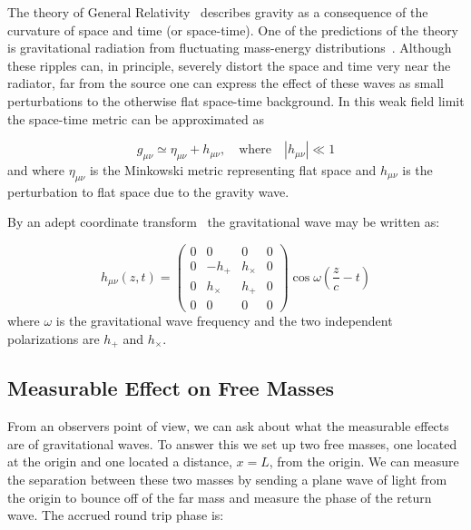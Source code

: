 

The theory of General Relativity~\cite{Einstein:Book} describes gravity as a 
consequence of the curvature of space and time (or space-time). One of the
predictions of the theory is gravitational radiation from fluctuating
mass-energy distributions~\cite{MTW}. Although these ripples can, 
in principle, severely distort the space and time very near the radiator,
far from the source one can express the effect of these waves as small
perturbations to the otherwise flat space-time background. In this weak field limit
the space-time metric can be approximated as

\begin{equation}
g_{\mu \nu} \simeq \eta_{\mu \nu} + h_{\mu \nu}, 
                  \quad \mbox{where} \quad   |h_{\mu \nu}| \ll 1
\label{eq:gmunu}
\end{equation}
and where $\eta_{\mu \nu}$ is the Minkowski metric representing flat space and 
$h_{\mu \nu}$ is the perturbation to flat space due to the gravity wave.

By an adept coordinate transform~\cite{MTW} the gravitational wave may be written as:

\begin{equation}
h_{\mu \nu}(z,t) = 
\left(
\begin{matrix}
0    & 0        & 0          & 0 \\
0    & -h_{+}    &  h_{\times}     & 0 \\
0    & h_{\times}    & h_{+}     & 0 \\
0    & 0        & 0          & 0 
\end{matrix} 
\right) 
\cos{\omega \left( \frac{z}{c}- t \right)}
\label{eq:hmatrix}
\end{equation}
where $\omega$ is the gravitational wave frequency and the two independent 
polarizations are $h_{+}$ and $h_{\times}$.



\subsection{Measurable Effect on Free Masses}

From an observers point of view, we can ask about what the measurable effects are
of gravitational waves. To answer this we set up two free masses, one located at
the origin and one located a distance, $x = L$, from the origin. We can measure the
separation between these two masses by sending a plane wave of light from the origin
to bounce off of the far mass and measure the phase of the return wave.
The accrued round trip phase is:

